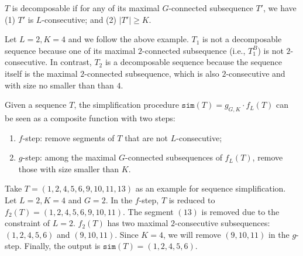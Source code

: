 \begin{definition}
$T$ is decomposable if for any of its maximal $G$-connected subsequence $T'$, we have (1) $T'$ is $L$-consecutive; and (2) $|T'|\geq K$.
\end{definition}

\begin{example}
Let $L = 2, K = 4$ and we follow the above example. $T_1$ is not a decomposable sequence
because one of its maximal $2$-connected subsequence (i.e., $T_1^B$) is not $2$-consecutive.
In contrast, $T_2$ is a decomposable sequence because the sequence itself is the maximal $2$-connected subsequence, which is also $2$-consecutive and with size no smaller than than $4$.
\end{example}

\begin{definition}
Given a sequence $T$, the simplification procedure $\mathtt{sim}(T) =  g_{G,K} \cdot f_L(T) $ can be seen as a composite function with two steps: 
\begin{enumerate}
\item $f$-step: remove segments of $T$ that are not $L$-consecutive;
\item $g$-step: among the maximal $G$-connected subsequences of $f_L(T)$, remove those with size smaller than $K$.
\end{enumerate}
\end{definition}


\begin{example}
Take $T=(1,2,4,5,6,9,10,11,13)$ as an example for sequence simplification. 
Let $L = 2, K = 4$ and $G = 2$. In the $f$-step, $T$ is reduced to $f_2(T)=(1,2,4,5,6,9,10,11)$. 
The segment $(13)$ is removed due to the constraint of $L=2$. 
$f_2(T)$ has two maximal $2$-consecutive subsequences: $(1,2,4,5,6)$ and $(9,10,11)$. 
Since $K=4$, we will remove $(9,10,11)$ in the $g$-step. Finally, the output is $\mathtt{sim}(T)=(1,2,4,5,6)$.
\end{example}

